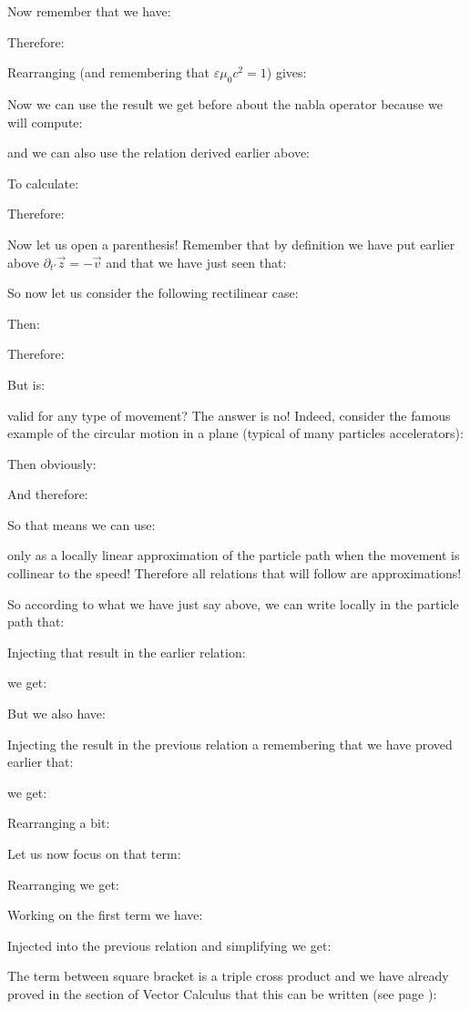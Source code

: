 	Now remember that we have:
	
	Therefore:
	
	Rearranging (and remembering that $\varepsilon\mu_0c^2=1$) gives:
	
	Now we can use the result we get before about the nabla operator because we will compute:
	
	and we can also use the relation derived earlier above:
	
	To calculate:
	
	Therefore:
	
	Now let us open a parenthesis! Remember that by definition we have put earlier above $\partial_{t'} \vec{z}=-\vec{v}$ and that we have just seen that:
	
	So now let us consider the following rectilinear case:
	
	Then:
	
	Therefore:
	
	But is:
	
	valid for any type of movement? The answer is no! Indeed, consider the famous example of the circular motion in a plane (typical of many particles accelerators):
	
	Then obviously:
	
	And therefore:
	
	So that means we can use:
	
	only as a locally linear approximation of the particle path when the movement is collinear to the speed! Therefore all relations that will follow are approximations!
	
	So according to what we have just say above, we can write locally in the particle path that:
	
	Injecting that result in the earlier relation:
	
	we get:
	
	But we also have:
	
	Injecting the result in the previous relation a remembering that we have proved earlier that:
	
	we get:
	
	Rearranging a bit:
	
	Let us now focus on that term:
	
	Rearranging we get:
	
	Working on the first term we have:
	
	Injected into the previous relation and simplifying we get:
	
	The term between square bracket is a triple cross product and we have already proved in the section of Vector Calculus that this can be written (see page \pageref{grassman rule}):
	
